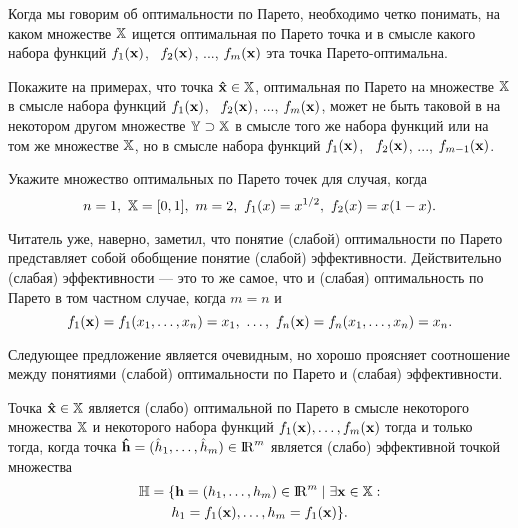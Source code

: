     Когда мы говорим об оптимальности по Парето, необходимо четко
    понимать, на каком множестве $\mathbb{X}$ ищется оптимальная по Парето
    точка и в смысле какого набора функций
    $f_1(\mathbf{x})$, \ $f_2(\mathbf{x})$, ..., $f_m(\mathbf{x})$
    эта точка Парето-оптимальна.

\begin{exer}
    Покажите на примерах, что точка $\mathbf{\hat x} \in  \mathbb{X}$,
    оптимальная по Парето на множестве $\mathbb{X}$ в смысле набора функций
    $f_1(\mathbf{x})$, \ $f_2(\mathbf{x})$, ..., $f_m(\mathbf{x})$, может
    не  быть таковой в на некотором другом множестве
    $\mathbb{Y}\supset\mathbb{X}$ в смысле того же набора функций или на том
    же множестве $\mathbb{X}$, но в смысле набора функций
    $f_1(\mathbf{x})$, \ $f_2(\mathbf{x})$, ..., $f_{m-1}(\mathbf{x})$.
\end{exer}

\begin{exer}
    Укажите множество оптимальных по Парето точек для случая, когда
\[
    n=1, \ \st{X}=[0,1], \ m=2, \ f_{1}(x)=x^{1/2}, \ f_{2}(x)=x(1-x).
\]
\end{exer}

    Читатель уже, наверно, заметил, что понятие (слабой) оптимальности по Парето представляет собой
    обобщение понятие (слабой) эффективности. Действительно (слабая) эффективности --- это то же
    самое, что и (слабая)
    оптимальность по Парето в том частном случае, когда $m=n$ и
\[
    f_{1}(\vc{x})=f_{1}(x_{1},\ldots,x_{n})=x_{1}, \ \ldots,
    \ f_{n}(\vc{x})=f_{n}(x_{1},\ldots,x_{n})=x_{n}.
\]

    Следующее предложение является очевидным, но хорошо проясняет соотношение между понятиями
    (слабой) оптимальности по Парето и (слабая) эффективности.

\begin{prop}
    Точка $\mathbf{\hat x} \in \mathbb{X}$ является (слабо) оптимальной по Парето в смысле некоторого
    множества $\mathbb{X}$ и некоторого набора функций $f_{1}(\mathbf{x}),\ldots,f_{m}(\mathbf{x})$ тогда
    и только тогда, когда точка $\mathbf{\hat{h}}=(\hat{h}_{1},\ldots,\hat{h}_{m})\in {\rm I\!R}^{m}$
    является (слабо) эффективной точкой множества
\begin{multline}
  \label{mnoj-H}
    \mathbb{H}=\{\mathbf{h}=(h_{1},\ldots,h_{m})\in {\rm I\!R}^{m}  \mid \exists \mathbf{x}\in\mathbb{X} : \\
    h_{1}=f_{1}(\mathbf{x}),\ldots,h_{m}=f_{1}(\mathbf{x})\}.
\end{multline}
\end{prop}

